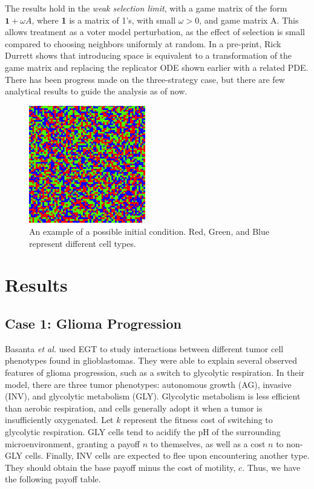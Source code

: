 \documentclass[12pt]{report}
\begin{document}
The results hold in the \textit{weak selection limit}, with a game matrix of the form $\textbf{1} + \omega A$, where \textbf{1} is a matrix of 1's, with small $\omega > 0$, and game matrix A. This allows treatment as a voter model perturbation, as the effect of selection is small compared to choosing neighbors uniformly at random. In a pre-print, Rick Durrett shows that introducing space is equivalent to a transformation of the game matrix and replacing the replicator ODE shown earlier with a related PDE. There has been progress made on the three-strategy case, but there are few analytical results to guide the analysis as of now.\\



\begin{figure}[t]
\caption{An example of a possible initial condition. Red, Green, and Blue represent different cell types.}
\centering
\includegraphics[width = 2in]{Diagrams/General/even_random_mix}
\end{figure}

\chapter*{Results}


\section*{Case 1: Glioma Progression}
Basanta \textit{et al.} used EGT to study interactions between different tumor cell phenotypes found in glioblastomas. They were able to explain several observed features of glioma progression, such as a switch to glycolytic respiration. In their model, there are three tumor phenotypes: autonomous growth (AG), invasive (INV), and glycolytic metabolism (GLY). Glycolytic metabolism is less efficient than aerobic respiration, and cells generally adopt it when a tumor is insufficiently oxygenated. Let $k$ represent the fitness cost of switching to glycolytic respiration. GLY cells tend to acidify the pH of the surrounding microenvironment, granting a payoff $n$ to themselves, as well as a cost $n$ to non-GLY cells. Finally, INV cells are expected to flee upon encountering another type. They should obtain the base payoff minus the cost of motility, $c$. Thus, we have the following payoff table. 
\end{document}
